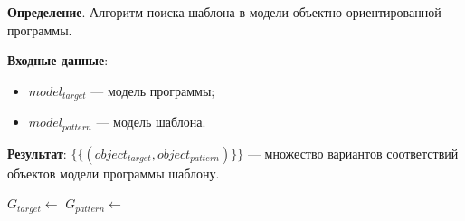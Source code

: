 \textbf{Определение}. Алгоритм поиска шаблона в модели объектно-ориентированной программы.

\textbf{Входные данные}:
\begin{itemize}
\item $model_{target}$ --- модель программы;
\item $model_{pattern}$ --- модель шаблона.
\end{itemize}

\textbf{Результат}: $\{ \{ ( object_{target}, object_{pattern} ) \} \}$
--- множество вариантов соответствий объектов модели программы шаблону.

\begin{algorithmic}
    \State $G_{target} \gets$ 
    \State $G_{pattern} \gets$ 
    \State \Return {}
\EndFunction
\end{algorithmic}
